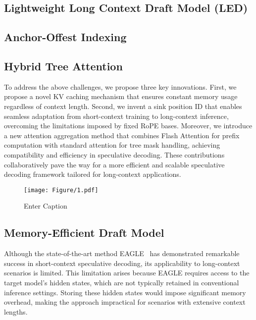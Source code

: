 \subsection{Lightweight Long Context Draft Model (LED)}
\subsection{Anchor-Offest Indexing}
\subsection{Hybrid Tree Attention}


To address the above challenges, we propose three key innovations. First, we propose a novel KV caching mechanism that ensures constant memory usage regardless of context length. Second, we invent a sink position ID that enables seamless adaptation from short-context training to long-context inference, overcoming the limitations imposed by fixed RoPE bases. Moreover, we introduce a new attention aggregation method that combines Flash Attention for prefix computation with standard attention for tree mask handling, achieving compatibility and efficiency in speculative decoding. These contributions collaboratively pave the way for a more efficient and scalable speculative decoding framework tailored for long-context applications.

\begin{figure}
    \centering
    \texttt{[image: Figure/1.pdf]}
    \caption{Enter Caption}
    \label{fig:enter-label}
\end{figure}

\subsection{Memory-Efficient Draft Model}

Although the state-of-the-art method EAGLE~\cite{li2024eagle} has demonstrated remarkable success in short-context speculative decoding, its applicability to long-context scenarios is limited. This limitation arises because EAGLE requires access to the target model's hidden states, which are not typically retained in conventional inference settings. Storing these hidden states would impose significant memory overhead, making the approach impractical for scenarios with extensive context lengths.

